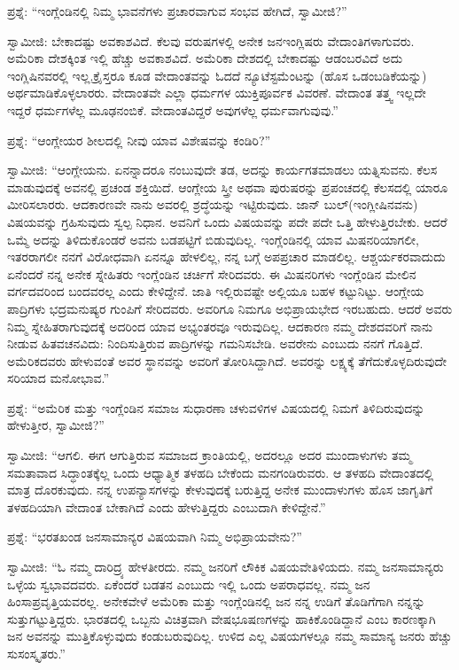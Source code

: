 ಪ್ರಶ್ನೆ: “ಇಂಗ್ಲೆಂಡಿನಲ್ಲಿ ನಿಮ್ಮ ಭಾವನೆಗಳು ಪ್ರಚಾರವಾಗುವ ಸಂಭವ ಹೇಗಿದೆ, ಸ್ವಾಮೀಜಿ?”

ಸ್ವಾಮೀಜಿ: ಬೇಕಾದಷ್ಟು ಅವಕಾಶವಿದೆ. ಕೆಲವು ವರುಷಗಳಲ್ಲಿ ಅನೇಕ ಜನ\break ಇಂಗ್ಲಿಷರು ವೇದಾಂತಿಗಳಾಗುವರು. ಅಮೆರಿಕಾ ದೇಶಕ್ಕಿಂತ ಇಲ್ಲಿ ಹೆಚ್ಚು ಅವಕಾಶವಿದೆ. ಅಮೆರಿಕಾ ದೇಶದಲ್ಲಿ ಬೇಕಾದಷ್ಟು ಆಡಂಬರವಿದೆ ಅದು ಇಂಗ್ಲಿಷಿನವರಲ್ಲಿ ಇಲ್ಲ.\break ಕ್ರೈಸ್ತರೂ ಕೂಡ ವೇದಾಂತವನ್ನು ಓದದೆ ನ್ಯೂಟೆಸ್ಟಮೆಂಟನ್ನು (ಹೊಸ ಒಡಂಬಡಿಕೆಯನ್ನು) ಅರ್ಥಮಾಡಿಕೊಳ್ಳಲಾರರು. ವೇದಾಂತವೇ ಎಲ್ಲಾ ಧರ್ಮಗಳ ಯುಕ್ತಿಪೂರ್ವಕ ವಿವರಣೆ. ವೇದಾಂತ ತತ್ತ್ವ ಇಲ್ಲದೇ ಇದ್ದರೆ ಧರ್ಮಗಳೆಲ್ಲ ಮೂಢನಂಬಿಕೆ. ವೇದಾಂತವಿದ್ದರೆ ಅವುಗಳೆಲ್ಲ ಧರ್ಮವಾಗುವುವು.”

ಪ್ರಶ್ನೆ: “ಆಂಗ್ಲೇಯರ ಶೀಲದಲ್ಲಿ ನೀವು ಯಾವ ವಿಶೇಷವನ್ನು ಕಂಡಿರಿ?”

ಸ್ವಾಮೀಜಿ: “ಆಂಗ್ಲೇಯನು. ಏನನ್ನಾದರೂ ನಂಬುವುದೇ ತಡ, ಅದನ್ನು ಕಾರ್ಯಗತಮಾಡಲು ಯತ್ನಿಸುವನು. ಕೆಲಸ ಮಾಡುವುದಕ್ಕೆ ಅವನಲ್ಲಿ ಪ್ರಚಂಡ ಶಕ್ತಿಯಿದೆ. ಆಂಗ್ಲೇಯ ಸ್ತ್ರೀ ಅಥವಾ ಪುರುಷರನ್ನು ಪ್ರಪಂಚದಲ್ಲಿ ಕೆಲಸದಲ್ಲಿ ಯಾರೂ ಮೀರಿಸಲಾರರು. ಆದಕಾರಣವೇ ನಾನು ಅವರಲ್ಲಿ ಶ್ರದ್ಧೆಯನ್ನು ಇಟ್ಟಿರುವುದು. ಜಾನ್​ ಬುಲ್​ (ಇಂಗ್ಲೀಷಿನವನು) ವಿಷಯವನ್ನು ಗ್ರಹಿಸುವುದು ಸ್ವಲ್ಪ ನಿಧಾನ. ಅವನಿಗೆ ಒಂದು ವಿಷಯವನ್ನು ಪದೇ ಪದೇ ಒತ್ತಿ ಹೇಳುತ್ತಿರಬೇಕು. ಆದರೆ ಒಮ್ಮೆ ಅದನ್ನು ತಿಳಿದುಕೊಂಡರೆ ಅವನು ಬಡಪಟ್ಟಿಗೆ ಬಿಡುವುದಿಲ್ಲ. ಇಂಗ್ಲೆಂಡಿನಲ್ಲಿ ಯಾವ ಮಿಷನರಿಯಾಗಲೀ, ಇತರರಾಗಲೀ ನನಗೆ ವಿರೋಧವಾಗಿ ಏನನ್ನೂ ಹೇಳಲಿಲ್ಲ, ನನ್ನ ಬಗ್ಗೆ ಅಪಪ್ರಚಾರ ಮಾಡಲಿಲ್ಲ. ಆಶ್ಚರ್ಯಕರವಾದುದು ಏನೆಂದರೆ ನನ್ನ ಅನೇಕ ಸ್ನೇಹಿತರು ಇಂಗ್ಲೆಂಡಿನ ಚರ್ಚಿಗೆ ಸೇರಿದವರು. ಈ ಮಿಷನರಿಗಳು ಇಂಗ್ಲೆಂಡಿನ ಮೇಲಿನ ವರ್ಗದವರಿಂದ ಬಂದವರಲ್ಲ ಎಂದು ಕೇಳಿದ್ದೇನೆ. ಜಾತಿ ಇಲ್ಲಿರುವಷ್ಟೇ ಅಲ್ಲಿಯೂ ಬಹಳ ಕಟ್ಟುನಿಟ್ಟು. ಆಂಗ್ಲೇಯ ಪಾದ್ರಿಗಳು ಭದ್ರಮನುಷ್ಯರ ಗುಂಪಿಗೆ ಸೇರಿದವರು. ಅವರಿಗೂ ನಿಮಗೂ ಅಭಿಪ್ರಾಯಭೇದ ಇರಬಹುದು. ಆದರೆ ಅವರು ನಿಮ್ಮ ಸ್ನೇಹಿತರಾಗುವುದಕ್ಕೆ ಅದರಿಂದ ಯಾವ ಅಭ್ಯಂತರವೂ ಇರುವುದಿಲ್ಲ. ಆದಕಾರಣ ನಮ್ಮ ದೇಶದವರಿಗೆ ನಾನು ನೀಡುವ ಹಿತವಚನವಿದು: ನಿಂದಿಸುತ್ತಿರುವ ಪಾದ್ರಿಗಳನ್ನು ಗಮನಿಸಬೇಡಿ. ಅವರೇನು ಎಂಬುದು ನನಗೆ ಗೊತ್ತಿದೆ. ಅಮೆರಿಕದವರು ಹೇಳುವಂತೆ ಅವರ ಸ್ಥಾನವನ್ನು ಅವರಿಗೆ ತೋರಿಸಿದ್ದಾಗಿದೆ. ಅವರನ್ನು ಲಕ್ಷ್ಯಕ್ಕೆ ತೆಗೆದುಕೊಳ್ಳದಿರುವುದೇ ಸರಿಯಾದ ಮನೋಭಾವ.”

ಪ್ರಶ್ನೆ: “ಅಮೆರಿಕ ಮತ್ತು ಇಂಗ್ಲೆಂಡಿನ ಸಮಾಜ ಸುಧಾರಣಾ ಚಳುವಳಿಗಳ ವಿಷಯದಲ್ಲಿ ನಿಮಗೆ ತಿಳಿದಿರುವುದನ್ನು ಹೇಳುತ್ತೀರ, ಸ್ವಾಮೀಜಿ?”

ಸ್ವಾಮೀಜಿ: “ಆಗಲಿ. ಈಗ ಆಗುತ್ತಿರುವ ಸಮಾಜದ ಕ್ರಾಂತಿಯಲ್ಲಿ, ಅದರಲ್ಲೂ ಅದರ ಮುಂದಾಳುಗಳು ತಮ್ಮ ಸಮತಾವಾದ ಸಿದ್ಧಾಂತಕ್ಕೆಲ್ಲ ಒಂದು ಆಧ್ಯಾತ್ಮಿಕ ತಳಹದಿ ಬೇಕೆಂದು ಮನಗಂಡಿರುವರು. ಆ ತಳಹದಿ ವೇದಾಂತದಲ್ಲಿ ಮಾತ್ರ ದೊರಕುವುದು. ನನ್ನ ಉಪನ್ಯಾಸಗಳನ್ನು ಕೇಳುವುದಕ್ಕೆ ಬರುತ್ತಿದ್ದ ಅನೇಕ ಮುಂದಾಳುಗಳು ಹೊಸ ಜಾಗೃತಿಗೆ ತಳಹದಿಯಾಗಿ ವೇದಾಂತ ಬೇಕಾಗಿದೆ ಎಂದು ಹೇಳುತ್ತಿದ್ದರು ಎಂಬುದಾಗಿ ಕೇಳಿದ್ದೇನೆ.”

ಪ್ರಶ್ನೆ: “ಭರತಖಂಡ ಜನಸಾಮಾನ್ಯರ ವಿಷಯವಾಗಿ ನಿಮ್ಮ ಅಭಿಪ್ರಾಯವೇನು?”

ಸ್ವಾಮೀಜಿ: “ಓ ನಮ್ಮ ದಾರಿದ್ರ್ಯ ಹೇಳತೀರದು. ನಮ್ಮ ಜನರಿಗೆ ಲೌಕಿಕ ವಿಷಯವೇ\break ತಿಳಿಯದು. ನಮ್ಮ ಜನಸಾಮಾನ್ಯರು ಒಳ್ಳೆಯ ಸ್ವಭಾವದವರು. ಏಕೆಂದರೆ ಬಡತನ ಎಂಬುದು ಇಲ್ಲಿ ಒಂದು ಅಪರಾಧವಲ್ಲ. ನಮ್ಮ ಜನ ಹಿಂಸಾಪ್ರವೃತ್ತಿಯವರಲ್ಲ. ಅನೇಕವೇಳೆ ಅಮೆರಿಕಾ ಮತ್ತು ಇಂಗ್ಲೆಂಡಿನಲ್ಲಿ ಜನ ನನ್ನ ಉಡಿಗೆ ತೊಡಿಗೆಗಾಗಿ ನನ್ನನ್ನು ಸುತ್ತುಗಟ್ಟುತ್ತಿದ್ದರು. ಭಾರತದಲ್ಲಿ ಒಬ್ಬನು ವಿಚಿತ್ರವಾಗಿ ವೇಷಭೂಷಣಗಳನ್ನು ಹಾಕಿಕೊಂಡಿದ್ದಾನೆ ಎಂಬ ಕಾರಣಕ್ಕಾಗಿ ಜನ ಅವನನ್ನು ಮುತ್ತಿಕೊಳ್ಳುವುದು ಕಂಡುಬರುವುದಿಲ್ಲ. ಉಳಿದ ಎಲ್ಲ ವಿಷಯಗಳಲ್ಲೂ ನಮ್ಮ ಸಾಮಾನ್ಯ ಜನರು ಹೆಚ್ಚು ಸುಸಂಸ್ಕೃತರು.”

